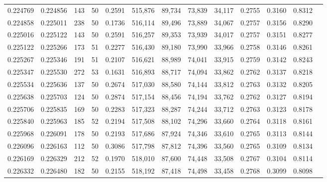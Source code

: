 \begin{tabular}{rrrrrrrrrrrrr}
0.224769 & 0.224856 &   143 &  50 &                                     0.2591 & 515,876 &  89,734 &  73,839 &  34,117 & 0.2755 & 0.3160 & 0.8312 \\
0.224858 & 0.225011 &   238 &  50 &                                     0.1736 & 516,114 &  89,496 &  73,889 &  34,067 & 0.2757 & 0.3156 & 0.8290 \\
0.225016 & 0.225122 &   143 &  50 &                                     0.2591 & 516,257 &  89,353 &  73,939 &  34,017 & 0.2757 & 0.3151 & 0.8277 \\
0.225122 & 0.225266 &   173 &  51 &                                     0.2277 & 516,430 &  89,180 &  73,990 &  33,966 & 0.2758 & 0.3146 & 0.8261 \\
0.225267 & 0.225346 &   191 &  51 &                                     0.2107 & 516,621 &  88,989 &  74,041 &  33,915 & 0.2759 & 0.3142 & 0.8243 \\
0.225347 & 0.225530 &   272 &  53 &                                     0.1631 & 516,893 &  88,717 &  74,094 &  33,862 & 0.2762 & 0.3137 & 0.8218 \\
0.225534 & 0.225636 &   137 &  50 &                                     0.2674 & 517,030 &  88,580 &  74,144 &  33,812 & 0.2763 & 0.3132 & 0.8205 \\
0.225638 & 0.225703 &   124 &  50 &                                     0.2874 & 517,154 &  88,456 &  74,194 &  33,762 & 0.2762 & 0.3127 & 0.8194 \\
0.225706 & 0.225835 &   169 &  50 &                                     0.2283 & 517,323 &  88,287 &  74,244 &  33,712 & 0.2763 & 0.3123 & 0.8178 \\
0.225840 & 0.225963 &   185 &  52 &                                     0.2194 & 517,508 &  88,102 &  74,296 &  33,660 & 0.2764 & 0.3118 & 0.8161 \\
0.225968 & 0.226091 &   178 &  50 &                                     0.2193 & 517,686 &  87,924 &  74,346 &  33,610 & 0.2765 & 0.3113 & 0.8144 \\
0.226096 & 0.226163 &   112 &  50 &                                     0.3086 & 517,798 &  87,812 &  74,396 &  33,560 & 0.2765 & 0.3109 & 0.8134 \\
0.226169 & 0.226329 &   212 &  52 &                                     0.1970 & 518,010 &  87,600 &  74,448 &  33,508 & 0.2767 & 0.3104 & 0.8114 \\
0.226332 & 0.226480 &   182 &  50 &                                     0.2155 & 518,192 &  87,418 &  74,498 &  33,458 & 0.2768 & 0.3099 & 0.8098 \\

\end{tabular}
